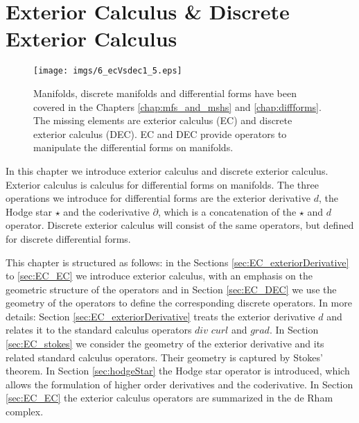 \chapter{Exterior Calculus \& Discrete Exterior Calculus}
\label{chap:EC}

\begin{figure}[h]
\begin{center}
\texttt{[image: imgs/6\_ecVsdec1\_5.eps]}%
\vspace{-0.5cm}
\caption{Manifolds, discrete manifolds and differential forms have been covered in the Chapters \ref{chap:mfs_and_mshs} and \ref{chap:diffforms}. The missing elements are exterior calculus (EC) and discrete exterior calculus (DEC).  EC and DEC provide operators to manipulate the differential forms on manifolds.}
\end{center}
\vspace{-0.2cm}
\end{figure}
In this chapter we introduce exterior calculus and discrete exterior calculus. Exterior calculus  is calculus for differential forms on manifolds. The three operations we introduce for differential forms are the exterior derivative $d$, the Hodge star $\star$ and the coderivative $\partial$, which is a concatenation of the $\star$ and $d$ operator. Discrete exterior calculus will consist of the same operators, but defined for discrete differential forms.

This chapter is structured as follows: in the Sections \ref{sec:EC_exteriorDerivative} to \ref{sec:EC_EC} we introduce exterior calculus, with an emphasis on the geometric structure of the operators and in Section \ref{sec:EC_DEC} we use the geometry of the operators to define the corresponding discrete operators. In more details: Section \ref{sec:EC_exteriorDerivative} treats the exterior derivative $d$ and relates it to the standard calculus operators $div$ $curl$ and $grad$. In Section \ref{sec:EC_stokes} we consider the geometry of the exterior derivative and its related standard calculus operators. Their geometry is captured by Stokes' theorem. In Section \ref{sec:hodgeStar} the Hodge star operator is introduced, which allows the formulation of higher order derivatives and the coderivative. In Section \ref{sec:EC_EC} the exterior calculus operators are summarized in the de Rham complex. 

